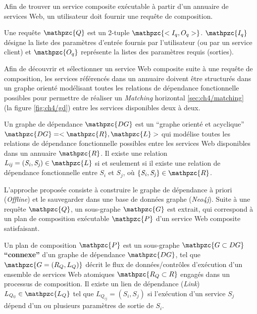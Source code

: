Afin de trouver un service composite exécutable à partir d'un annuaire
de services Web, un utilisateur doit fournir une requête de
composition.\medskip

\begin{mydef}
  Une requête $\mathpzc{Q}$ est un 2-tuple $\mathpzc{<I_q, O_q>}$.
  $\mathpzc{I_q}$ désigne la liste des paramètres d'entrée fournis par
  l'utilisateur (ou par un service client) et $\mathpzc{O_q}$
  représente la listes des paramètres requis (sorties).
\end{mydef}

Afin de découvrir et sélectionner un service Web composite suite à une
requête de composition, les services référencés dans un annuaire
doivent être structurés dans un graphe orienté modélisant toutes les
relations de dépendance fonctionnelle possibles pour permettre de
réaliser un \textit{Matching} horizontal \ref{sec:ch4/matching} (la
figure \ref{fig:ch4/gd}) entre les services disponibles deux à
deux.\medskip



\begin{mydef}
  Un graphe de dépendance $\mathpzc{DG}$ est un ``graphe orienté et
  acyclique'' $\mathpzc{DG}=<\mathpzc{R}, \mathpzc{L}>$ qui modélise
  toutes les relations de dépendance fonctionnelle possibles entre les
  services Web disponibles dans un annuaire $\mathpzc{R}$. Il existe
  une relation
  $\mathit{L_{ij}}=(\mathit{S_i}, \mathit{S_j}) \in \mathpzc{L}$ si et
  seulement si il existe une relation de dépendance fonctionnelle
  entre $\mathit{S_i}$ et $\mathit{S_j}$, où
  $\{\mathit{S_i, S_j}\} \in \mathpzc{R}$.\medskip
\end{mydef}

L'approche proposée consiste à construire le graphe de dépendance à
priori (\textit{Offline}) et le sauvegarder dans une base de données
graphe (\textit{Neo4j}). Suite à une requête $\mathpzc{Q}$, un
sous-graphe $\mathpzc{G}$ est extrait, qui correspond à un plan de
composition exécutable $\mathpzc{P}$ d'un service Web composite
satisfaisant.\medskip



\begin{mydef}
  Un plan de composition $\mathpzc{P}$ est un sous-graphe
  $\mathpzc{G \subset DG}$ \textbf{``connexe''} d'un graphe de
  dépendance $\mathpzc{DG}$, tel que $\mathpzc{G=(R_Q,L_Q)}$ décrit le
  flux de données/contrôles d'exécution d'un ensemble de services Web
  atomiques $\mathpzc{R_Q \subset R}$ engagés dans un processus de
  composition. Il existe un lien de dépendance (\textit{Link})
  $\mathit{L_{Q_{ij}}} \in \mathpzc{L_Q}$ tel que
  $\mathit{L_{Q_{ij}}} = (S_i, S_j)$ si l'exécution d'un service
  $\mathit{S_j}$ dépend d'un ou plusieurs paramètres de sortie de
  $\mathit{S_i}$.\medskip
\end{mydef}


